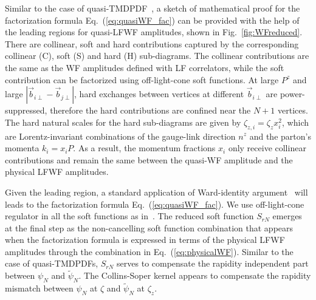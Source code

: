 \documentclass[twocolumn,superscriptaddress,longbibliography,10pt]{revtex4-1}
\begin{document}
Similar to the case of quasi-TMDPDF~\cite{Ji:2019ewn}, a sketch of mathematical proof for the factorization formula Eq.~(\ref{eq:quasiWF_fac}) can be provided with the help of the leading regions for quasi-LFWF amplitudes, shown in Fig.~\ref{fig:WFreduced}. There are collinear, soft and hard contributions captured by the corresponding collinear (C), soft (S) and hard (H) sub-diagrams. The collinear contributions are the same as the WF amplitudes defined with LF correlators, while the soft contribution can be factorized using off-light-cone soft functions. At large $P^z$ and large $|\vec{b}_{i\perp}-\vec{b}_{j\perp}|$, hard exchanges between vertices at different $\vec{b}_{i\perp}$ are power-suppressed, therefore the hard contributions are confined near the $N+1$ vertices. The hard natural scales for the hard sub-diagrams are given by $\zeta_{z,i}=\zeta_z x_i^2$, which are Lorentz-invariant combinations of the gauge-link direction $n^z$ and the parton's momenta $k_i=x_iP$. As a result, the momentum fractions $x_i$ only receive collinear contributions and remain the same between the quasi-WF amplitude and the physical LFWF amplitudes.

Given the leading region, a standard application of Ward-identity argument~\cite{Collins:2011zzd} will leads to the factorization formula Eq.~(\ref{eq:quasiWF_fac}). We use off-light-cone regulator in all the soft functions as in~\cite{Collins:2011zzd}. The reduced soft function $S_{rN}$ emerges at the final step as the non-cancelling soft function combination that appears when the factorization formula is expressed in terms of the physical LFWF amplitudes through the combination in Eq.~(\ref{eq:physicalWF}). Similar to the case of quasi-TMDPDFs, $S_{rN}$ serves to compensate the rapidity independent part between $\psi_N$ and $\tilde \psi_N$. The Collins-Soper kernel appears to compensate the rapidity mismatch between $\psi_N$ at $\zeta$ and $\tilde \psi_N$ at $\zeta_{z}$.
\end{document}
